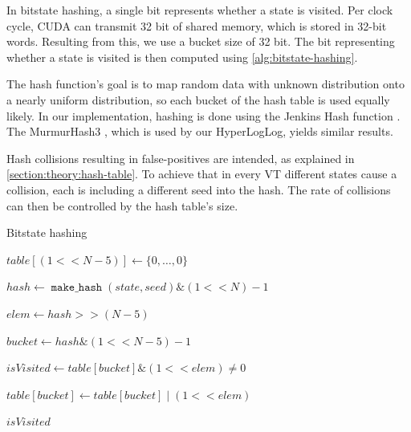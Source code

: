 \documentclass[
fancyheadings, %
%
%
]{stsreprt}
\DeclareMathOperator{\markVisited}{\texttt{mark\_visited}}
\DeclareMathOperator{\makeHash}{\texttt{make\_hash}}
\newcommand{\bitwiseAnd}{\mathbin{\text{\&}}}
\newcommand{\bitwiseOr}{\mathbin{\text{|}}}
\begin{document}
In bitstate hashing, a single bit represents whether a state is visited.
Per clock cycle, CUDA can transmit 32 bit of shared memory, which is stored in 32-bit words.
Resulting from this, we use a bucket size of 32 bit.
The bit representing whether a state is visited is then computed using \cref{alg:bitstate-hashing}.

The hash function's goal is to map random data with unknown distribution onto a nearly uniform distribution, so each bucket of the hash table is used equally likely.
In our implementation, hashing is done using the Jenkins Hash function \cite{JenkinsHash}.
The MurmurHash3 \cite{MurmurHash3}, which is used by our HyperLogLog, yields similar results.

Hash collisions resulting in false-positives are intended, as explained in \cref{section:theory:hash-table}.
To achieve that in every VT different states cause a collision, each is including a different seed into the hash.
The rate of collisions can then be controlled by the hash table's size.

\begin{algorithm}
    \caption{Bitstate hashing}
    \label{alg:bitstate-hashing}
    \begin{algorithmic}
        \State $table[(1 << N - 5)] \gets \{0, \dots, 0\}$

        \Statex

        \Function{$\markVisited$}{table, state}
        \State $hash \gets \makeHash(state, seed) \bitwiseAnd (1 << N) - 1$

        \State $elem \gets hash >> (N - 5)$

        \State $bucket \gets hash \bitwiseAnd (1 << N - 5) - 1$

        \State $isVisited \gets table[bucket] \bitwiseAnd (1 << elem) \neq 0$

        \State $table[bucket] \gets table[bucket] \bitwiseOr (1 << elem)$

        \Statex

        \State \Return $isVisited$
        \EndFunction
    \end{algorithmic}
\end{algorithm}
\end{document}
